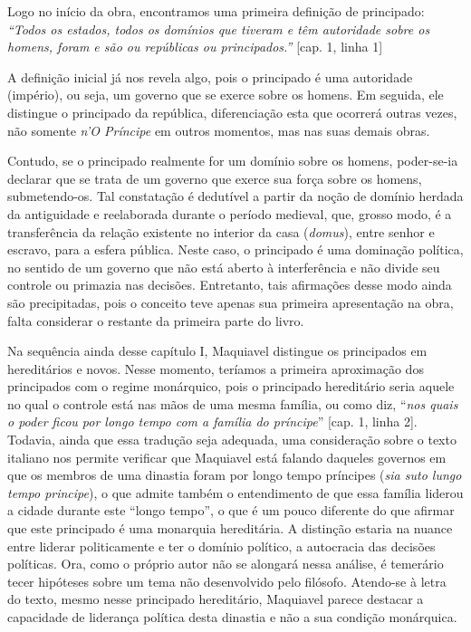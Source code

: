 Logo no início da obra, encontramos uma primeira definição de
principado: \emph{``Todos os estados, todos os domínios que tiveram e
têm autoridade sobre os homens, foram e são ou repúblicas ou
principados.''} {[}cap. 1, linha 1{]}

A definição inicial já nos revela algo, pois o principado é uma
autoridade (império), ou seja, um governo que se exerce sobre os homens.
Em seguida, ele distingue o principado da república, diferenciação esta
que ocorrerá outras vezes, não somente \emph{n'O Príncipe} em outros
momentos, mas nas suas demais obras.

Contudo, se o principado realmente for um domínio sobre os homens,
poder-se-ia declarar que se trata de um governo que exerce sua força
sobre os homens, submetendo-os. Tal constatação é dedutível a partir da
noção de domínio herdada da antiguidade e reelaborada durante o período
medieval, que, grosso modo, é a transferência da relação existente no
interior da casa (\emph{domus}), entre senhor e escravo, para a esfera
pública. Neste caso, o principado é uma dominação política, no sentido
de um governo que não está aberto à interferência e não divide seu
controle ou primazia nas decisões. Entretanto, tais afirmações desse
modo ainda são precipitadas, pois o conceito teve apenas sua primeira
apresentação na obra, falta considerar o restante da primeira parte do
livro.

Na sequência ainda desse capítulo I, Maquiavel distingue os principados
em hereditários e novos. Nesse momento, teríamos a primeira aproximação
dos principados com o regime monárquico, pois o principado hereditário
seria aquele no qual o controle está nas mãos de uma mesma família, ou
como diz, ``\emph{nos quais o poder ficou por longo tempo com a família
do príncipe}'' {[}cap. 1, linha 2{]}. Todavia, ainda que essa tradução
seja adequada, uma consideração sobre o texto italiano nos permite
verificar que Maquiavel está falando daqueles governos em que os membros
de uma dinastia foram por longo tempo príncipes (\emph{sia suto lungo
tempo principe}), o que admite também o entendimento de que essa família
liderou a cidade durante este ``longo tempo'', o que é um pouco
diferente do que afirmar que este principado é uma monarquia
hereditária. A distinção estaria na nuance entre liderar politicamente e
ter o domínio político, a autocracia das decisões políticas. Ora, como o
próprio autor não se alongará nessa análise, é temerário tecer hipóteses
sobre um tema não desenvolvido pelo filósofo. Atendo-se à letra do
texto, mesmo nesse principado hereditário, Maquiavel parece destacar a
capacidade de liderança política desta dinastia e não a sua condição
monárquica.

